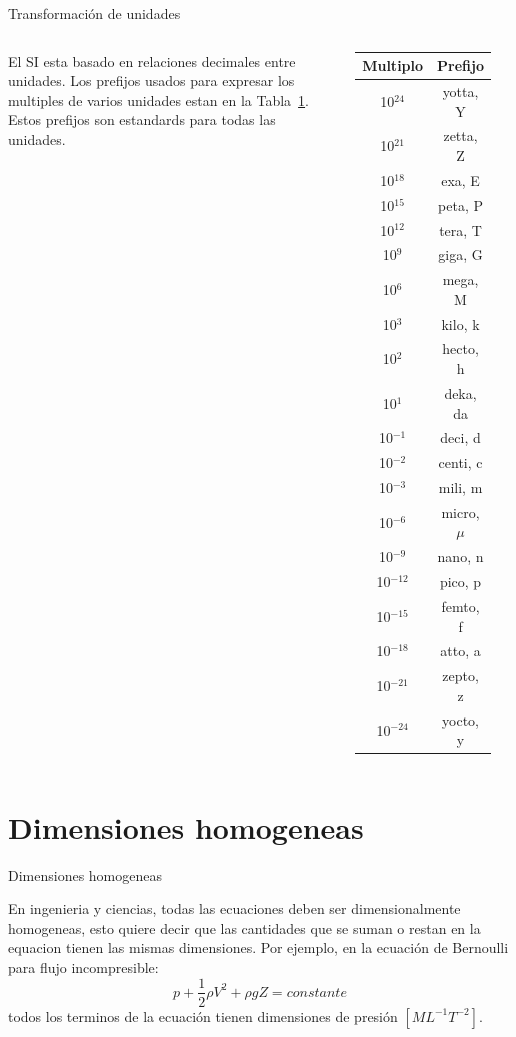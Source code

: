 \documentclass [xcolor=svgnames, t] {beamer}
\begin{document}
\begin{frame}{Transformaci\'on de unidades}
\vspace{-1.0cm}
\begin{columns}
\begin{exampleblock}{}
El SI esta basado en relaciones decimales entre unidades. Los prefijos usados para expresar los multiples de varios unidades estan en la Tabla~\ref{t1}. Estos prefijos son estandards para todas las unidades.
\end{exampleblock}{}

\scriptsize
\begin{table}[h!]
\centering
\begin{tabular}{c c}
 \hline
 Multiplo & Prefijo \\ [0.5ex]
 \hline\hline
 10$^{24}$ & yotta, Y \\
 10$^{21}$ & zetta, Z \\
 10$^{18}$ & exa, E \\
 10$^{15}$ & peta, P \\
 10$^{12}$ & tera, T \\
 10$^{9}$ & giga, G \\
 10$^{6}$ & mega, M \\
 10$^{3}$ & kilo, k \\
 10$^{2}$ & hecto, h \\
 10$^{1}$ & deka, da \\
 10$^{-1}$ & deci, d \\
 10$^{-2}$ & centi, c \\
 10$^{-3}$ & mili, m \\
 10$^{-6}$ & micro, $\mu$ \\
 10$^{-9}$ & nano, n \\
 10$^{-12}$ & pico, p \\
 10$^{-15}$ & femto, f \\
 10$^{-18}$ & atto, a \\
 10$^{-21}$ & zepto, z \\
 10$^{-24}$ & yocto, y \\ [1ex]
  \hline
\end{tabular}
\label{t1}
\end{table}
\end{columns}
\end{frame}

\section{Dimensiones homogeneas}
\begin{frame}{Dimensiones homogeneas}
\begin{exampleblock}{}
En ingenieria y ciencias, todas las ecuaciones deben ser dimensionalmente homogeneas, esto quiere decir que las cantidades que se suman o restan en la equacion tienen las mismas dimensiones. Por ejemplo, en la ecuaci\'on de Bernoulli para flujo incompresible:
$$
p + \frac{1}{2} \rho V^2 + \rho g Z = constante
$$
todos los terminos de la ecuaci\'on tienen dimensiones de presi\'on $[ML^{-1}T^{-2}]$.
\end{exampleblock}{}
\end{frame}
\end{document}
